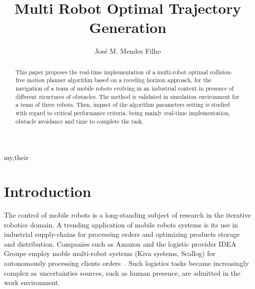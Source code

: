 \documentclass[eprint]{actapoly}
\begin{document}
\title[Trajectory Generation Approach]
{Multi Robot Optimal Trajectory Generation}

\author[J. M. Mendes Filho]{Jos\'{e} M. Mendes Filho}{my,their}


\begin{abstract}

 This paper proposes the real-time implementation of a multi-robot optimal collision-free motion planner
 algorithm based on a receding horizon approach, for the navigation of a team of mobile
 robots evolving in an industrial context in presence of different structures of obstacles.
 The method is validated in simulation environment for a team of three robots. Then, impact of the algorithm
 parameters setting is studied with regard to critical performance criteria, being mainly real-time implementation,
 obstacle avoidance and time to complete the task.
 
\end{abstract}


\maketitle




\section{Introduction}\label{sec:intro}





The %
control of mobile robots is a long-standing subject of research 
in the iterative robotics domain. A trending application of mobile robots systems
is its use in industrial supply-chains for processing orders and optimizing products storage and distribution. Companies such as Amazon and the logistic provider IDEA Groupe employ moble multi-robot systems (Kiva systems, Scallog) for autonomously processing clients orders~\cite{Gizmag,supplychain}.
Such logistics tasks became increasingly complex as uncertainties sources, such as human presence, are admitted in the work environment.
\end{document}
